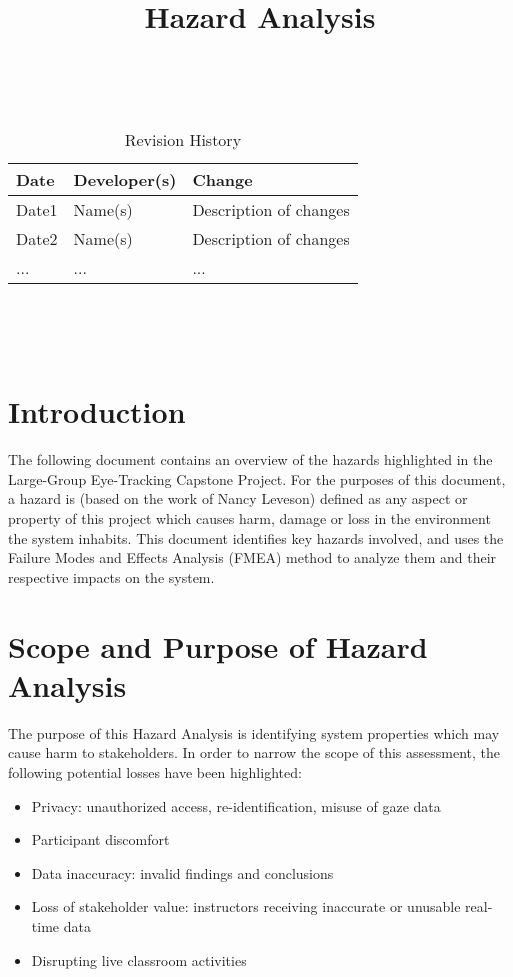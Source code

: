 \documentclass{article}
\title{Hazard Analysis\\\progname}
\author{\authname}
\date{}
\begin{document}
\maketitle
\thispagestyle{empty}

~\newpage


\begin{table}[hp]
\caption{Revision History} \label{TblRevisionHistory}
\begin{tabularx}{\textwidth}{llX}
\toprule
\textbf{Date} & \textbf{Developer(s)} & \textbf{Change}\\
\midrule
Date1 & Name(s) & Description of changes\\
Date2 & Name(s) & Description of changes\\
... & ... & ...\\
\bottomrule
\end{tabularx}
\end{table}

~\newpage

\tableofcontents

~\newpage



\section{Introduction}

The following document contains an overview of the hazards highlighted in the Large-Group Eye-Tracking Capstone Project. For the purposes of this document, a hazard is (based on the work of Nancy Leveson) defined as any aspect or property of this project which causes harm, damage or loss in the environment the system inhabits. This document identifies key hazards involved, and uses the Failure Modes and Effects Analysis (FMEA) method to analyze them and their respective impacts on the system. 

\section{Scope and Purpose of Hazard Analysis}

The purpose of this Hazard Analysis is identifying system properties which may cause harm to stakeholders. In order to narrow the scope of this assessment, the following potential losses have been highlighted:
\begin{itemize}
    \item Privacy: unauthorized access, re-identification, misuse of gaze data
    \item Participant discomfort
    \item Data inaccuracy: invalid findings and conclusions
    \item Loss of stakeholder value: instructors receiving inaccurate or unusable real-time data
    \item Disrupting live classroom activities
    \end{itemize}
\end{document}
